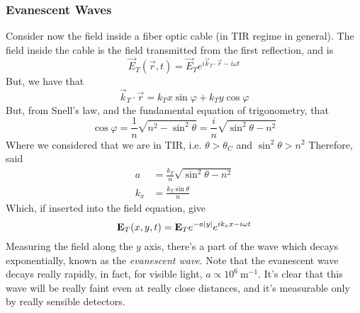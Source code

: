 \documentclass[../electromagnetism.tex]{subfiles}
\begin{document}
\subsubsection{Evanescent Waves}
Consider now the field inside a fiber optic cable (in TIR regime in general). The field inside the cable is the field transmitted from the first reflection, and is
\begin{equation*}
	\vec{E}_T(\vec{r}, t)=\vec{E}_Te^{i\vec{k}_T\cdot\vec{r}-i\omega t}
\end{equation*}
But, we have that 
\begin{equation*}
	\vec{k}_T\cdot\vec{r}=k_Tx\sin\varphi+k_Ty\cos\varphi
\end{equation*}
But, from Snell's law, and the fundamental equation of trigonometry, that
\begin{equation*}
	\cos\varphi=\frac{1}{n}\sqrt{n^2-\sin^2\theta}=\frac{i}{n}\sqrt{\sin^2\theta-n^2}
\end{equation*}
Where we considered that we are in TIR, i.e. $\theta>\theta_C$ and $\sin^2\theta>n^2$
Therefore, said
\begin{equation*}
	\begin{aligned}
		a&= \frac{k_T}{n}\sqrt{\sin^2\theta-n^2}\\
		k_x&= \frac{k_T\sin\theta}{n}
	\end{aligned}
\end{equation*}
Which, if inserted into the field equation, give
\begin{equation}
	\mathbf{E}_T(x, y, t)=\mathbf{E}_Te^{-a\abs{y}}e^{ik_xx-i\omega t}
	\label{eq:evanescentwave.tir}
\end{equation}
Measuring the field along the $y$ axis, there's a part of the wave which decays exponentially, known as the \textit{evanescent wave}. Note that the evanescent wave decays really rapidly, in fact, for visible light, $a\propto10^6\ \mathrm{m^{-1}}$. It's clear that this wave will be really faint even at really close distances, and it's measurable only by really sensible detectors.
\end{document}
